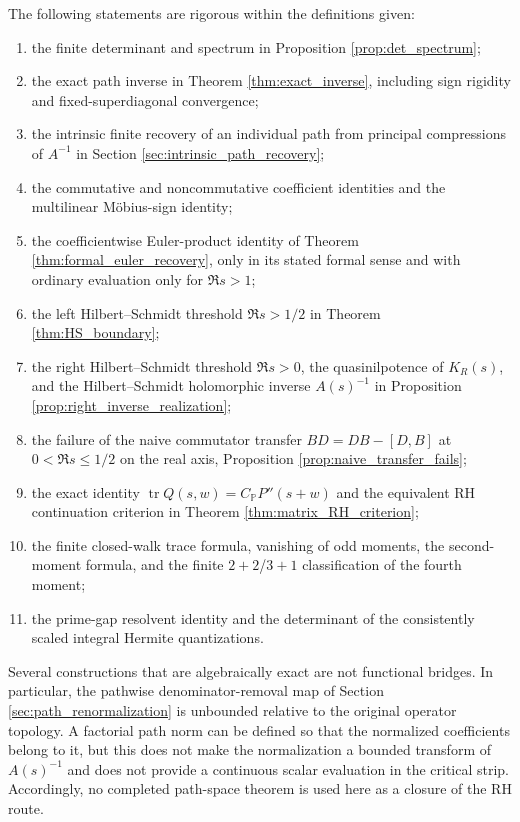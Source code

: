 \documentclass[11pt]{amsart}
\numberwithin{equation}{section}
\theoremstyle{plain}
\theoremstyle{definition}
\theoremstyle{remark}
\newcommand{\tr}{\operatorname{tr}}
\begin{document}
The following statements are rigorous within the definitions given:
\begin{enumerate}[label=(\roman*)]
\item the finite determinant and spectrum in Proposition \ref{prop:det_spectrum};
\item the exact path inverse in Theorem \ref{thm:exact_inverse}, including sign rigidity and fixed-superdiagonal convergence;
\item the intrinsic finite recovery of an individual path from principal compressions of $A^{-1}$ in Section \ref{sec:intrinsic_path_recovery};
\item the commutative and noncommutative coefficient identities and the multilinear M\"obius-sign identity;
\item the coefficientwise Euler-product identity of Theorem \ref{thm:formal_euler_recovery}, only in its stated formal sense and with ordinary evaluation only for $\Re s>1$;
\item the left Hilbert--Schmidt threshold $\Re s>1/2$ in Theorem \ref{thm:HS_boundary};
\item the right Hilbert--Schmidt threshold $\Re s>0$, the quasinilpotence of $K_R(s)$, and the Hilbert--Schmidt holomorphic inverse $A(s)^{-1}$ in Proposition \ref{prop:right_inverse_realization};
\item the failure of the naive commutator transfer $BD=DB-[D,B]$ at $0<\Re s\le1/2$ on the real axis, Proposition \ref{prop:naive_transfer_fails};
\item the exact identity $\tr Q(s,w)=C_{\mathbb P}P''(s+w)$ and the equivalent RH continuation criterion in Theorem \ref{thm:matrix_RH_criterion};
\item the finite closed-walk trace formula, vanishing of odd moments, the second-moment formula, and the finite $2+2$/$3+1$ classification of the fourth moment;
\item the prime-gap resolvent identity and the determinant of the consistently scaled integral Hermite quantizations.
\end{enumerate}

Several constructions that are algebraically exact are not functional bridges.  In particular, the pathwise denominator-removal map of Section \ref{sec:path_renormalization} is unbounded relative to the original operator topology.  A factorial path norm can be defined so that the normalized coefficients belong to it, but this does not make the normalization a bounded transform of $A(s)^{-1}$ and does not provide a continuous scalar evaluation in the critical strip.  Accordingly, no completed path-space theorem is used here as a closure of the RH route.
\end{document}
